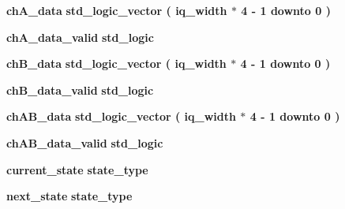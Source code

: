 \begin{DoxyCompactItemize}
\item 
{\bf ch\+A\+\_\+data} {\bfseries \textcolor{comment}{std\+\_\+logic\+\_\+vector}\textcolor{vhdlchar}{ }\textcolor{vhdlchar}{(}\textcolor{vhdlchar}{ }\textcolor{vhdlchar}{ }\textcolor{vhdlchar}{ }\textcolor{vhdlchar}{ }{\bfseries {\bf iq\+\_\+width}} \textcolor{vhdlchar}{$\ast$}\textcolor{vhdlchar}{ } \textcolor{vhdldigit}{4} \textcolor{vhdlchar}{-\/}\textcolor{vhdlchar}{ } \textcolor{vhdldigit}{1} \textcolor{vhdlchar}{ }\textcolor{keywordflow}{downto}\textcolor{vhdlchar}{ }\textcolor{vhdlchar}{ } \textcolor{vhdldigit}{0} \textcolor{vhdlchar}{ }\textcolor{vhdlchar}{)}\textcolor{vhdlchar}{ }} 
\item 
{\bf ch\+A\+\_\+data\+\_\+valid} {\bfseries \textcolor{comment}{std\+\_\+logic}\textcolor{vhdlchar}{ }} 
\item 
{\bf ch\+B\+\_\+data} {\bfseries \textcolor{comment}{std\+\_\+logic\+\_\+vector}\textcolor{vhdlchar}{ }\textcolor{vhdlchar}{(}\textcolor{vhdlchar}{ }\textcolor{vhdlchar}{ }\textcolor{vhdlchar}{ }\textcolor{vhdlchar}{ }{\bfseries {\bf iq\+\_\+width}} \textcolor{vhdlchar}{$\ast$}\textcolor{vhdlchar}{ } \textcolor{vhdldigit}{4} \textcolor{vhdlchar}{-\/}\textcolor{vhdlchar}{ } \textcolor{vhdldigit}{1} \textcolor{vhdlchar}{ }\textcolor{keywordflow}{downto}\textcolor{vhdlchar}{ }\textcolor{vhdlchar}{ } \textcolor{vhdldigit}{0} \textcolor{vhdlchar}{ }\textcolor{vhdlchar}{)}\textcolor{vhdlchar}{ }} 
\item 
{\bf ch\+B\+\_\+data\+\_\+valid} {\bfseries \textcolor{comment}{std\+\_\+logic}\textcolor{vhdlchar}{ }} 
\item 
{\bf ch\+A\+B\+\_\+data} {\bfseries \textcolor{comment}{std\+\_\+logic\+\_\+vector}\textcolor{vhdlchar}{ }\textcolor{vhdlchar}{(}\textcolor{vhdlchar}{ }\textcolor{vhdlchar}{ }\textcolor{vhdlchar}{ }\textcolor{vhdlchar}{ }{\bfseries {\bf iq\+\_\+width}} \textcolor{vhdlchar}{$\ast$}\textcolor{vhdlchar}{ } \textcolor{vhdldigit}{4} \textcolor{vhdlchar}{-\/}\textcolor{vhdlchar}{ } \textcolor{vhdldigit}{1} \textcolor{vhdlchar}{ }\textcolor{keywordflow}{downto}\textcolor{vhdlchar}{ }\textcolor{vhdlchar}{ } \textcolor{vhdldigit}{0} \textcolor{vhdlchar}{ }\textcolor{vhdlchar}{)}\textcolor{vhdlchar}{ }} 
\item 
{\bf ch\+A\+B\+\_\+data\+\_\+valid} {\bfseries \textcolor{comment}{std\+\_\+logic}\textcolor{vhdlchar}{ }} 
\item 
{\bf current\+\_\+state} {\bfseries {\bfseries {\bf state\+\_\+type}} \textcolor{vhdlchar}{ }} 
\item 
{\bf next\+\_\+state} {\bfseries {\bfseries {\bf state\+\_\+type}} \textcolor{vhdlchar}{ }} 
\end{DoxyCompactItemize}


